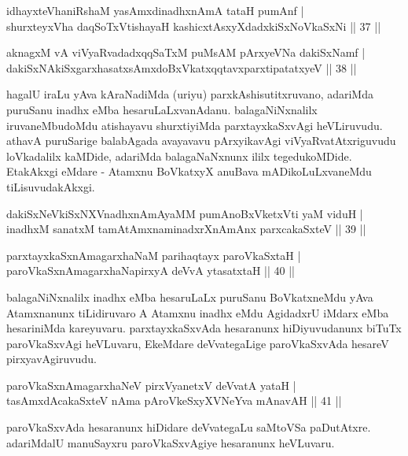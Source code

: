 \begin{shl}
idhayxteV\s haniRshaM yasAmxdinadhxnAmA tataH pumAnf |\\
shurxteyxVha daqSoTxV\s tishayaH kashicxtAsxyXdadxkiSxNoV\s kaSxNi \hfill || 37 || 
\end{shl}

\begin{shl}
aknagxM vA viVyaRvadadxqqSaTxM puMsAM pArxyeVNa dakiSxNamf |\\
dakiSxNAkiSxgarxhasatxsAmxdoBxVkatxqqtavxparxtipatatxyeV \hfill || 38 || 
\end{shl}

\begin{artha}
hagalU iraLu yAva kAraNadiMda (uriyu) parxkAshisutitxruvano, adariMda puruSanu inadhx eMba hesaruLaLxvanAdanu. balagaNiNxnalilx iruvaneMbudoMdu atishayavu shurxtiyiMda parxtayxkaSxvAgi heVLiruvudu. athavA puruSarige balabAgada avayavavu pArxyikavAgi viVyaRvatAtxriguvudu loVkadalilx kaMDide, adariMda balagaNaNxnunx ililx tegedukoMDide. EtakAkxgi eMdare - Atamxnu BoVkatxyX anuBava mADikoLuLxvaneMdu tiLisuvudakAkxgi.
\end{artha}

\begin{shl}
dakiSxNeV\s kiSxNXVnadhxnAmA\s yaMM pumAnoBxVketxVti yaM viduH |\\
inadhxM sanatxM tamAtAmxnaminadxrXnAmAnx parxcakaSxteV \hfill || 39 || 
\end{shl}

\begin{shl}
parxtayxkaSxnAmagarxhaNaM parihaqtayx paroVkaSxtaH |\\
paroVkaSxnAmagarxhaNapirxyA deVvA ytasatxtaH \hfill || 40 || 
\end{shl}

\begin{artha}
balagaNiNxnalilx inadhx eMba hesaruLaLx puruSanu BoVkatxneMdu yAva Atamxnanunx tiLidiruvaro A Atamxnu inadhx eMdu AgidadxrU iMdarx eMba hesariniMda kareyuvaru. parxtayxkaSxvAda hesaranunx hiDiyuvudanunx biTuTx paroVkaSxvAgi heVLuvaru, EkeMdare deVvategaLige paroVkaSxvAda hesareV pirxyavAgiruvudu.
\end{artha}

\begin{shl}
paroVkaSxnAmagarxhaNeV pirxVyanetxV deVvatA yataH |\\
tasAmxdAcakaSxteV nAma pAroVkeSxyXVNeYva mAnavAH \hfill || 41 || 
\end{shl}

\begin{artha}
paroVkaSxvAda hesaranunx hiDidare deVvategaLu saMtoVSa paDutAtxre. adariMdalU manuSayxru paroVkaSxvAgiye hesaranunx heVLuvaru.
\end{artha}

